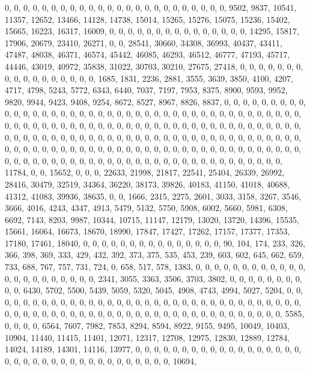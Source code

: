 \documentclass[
]{article}
\begin{document}
0, 0, 0, 0, 0, 0, 0, 0, 0, 0, 0, 0, 0, 0, 0, 0, 0, 0, 0, 0, 0, 0, 0, 0,
9502, 9837, 10541, 11357, 12652, 13466, 14128, 14738, 15014, 15265,
15276, 15075, 15236, 15402, 15665, 16223, 16317, 16009, 0, 0, 0, 0, 0,
0, 0, 0, 0, 0, 0, 0, 0, 0, 0, 14295, 15817, 17906, 20679, 23410, 26271,
0, 0, 28541, 30660, 34308, 36993, 40437, 43411, 47487, 48038, 46371,
46574, 45442, 46085, 46293, 46512, 46777, 47193, 45717, 44446, 43019,
40972, 35838, 31022, 30703, 30210, 27675, 27418, 0, 0, 0, 0, 0, 0, 0, 0,
0, 0, 0, 0, 0, 0, 0, 0, 0, 1685, 1831, 2236, 2881, 3555, 3639, 3850,
4100, 4207, 4717, 4798, 5243, 5772, 6343, 6440, 7037, 7197, 7953, 8375,
8900, 9593, 9952, 9820, 9944, 9423, 9408, 9254, 8672, 8527, 8967, 8826,
8837, 0, 0, 0, 0, 0, 0, 0, 0, 0, 0, 0, 0, 0, 0, 0, 0, 0, 0, 0, 0, 0, 0,
0, 0, 0, 0, 0, 0, 0, 0, 0, 0, 0, 0, 0, 0, 0, 0, 0, 0, 0, 0, 0, 0, 0, 0,
0, 0, 0, 0, 0, 0, 0, 0, 0, 0, 0, 0, 0, 0, 0, 0, 0, 0, 0, 0, 0, 0, 0, 0,
0, 0, 0, 0, 0, 0, 0, 0, 0, 0, 0, 0, 0, 0, 0, 0, 0, 0, 0, 0, 0, 0, 0, 0,
0, 0, 0, 0, 0, 0, 0, 0, 0, 0, 0, 0, 0, 0, 0, 0, 0, 0, 0, 0, 0, 0, 0, 0,
0, 0, 0, 0, 0, 0, 0, 0, 0, 0, 0, 0, 0, 0, 0, 0, 0, 0, 0, 0, 0, 0, 0, 0,
0, 0, 0, 0, 0, 0, 0, 0, 0, 0, 0, 0, 0, 0, 0, 0, 0, 0, 0, 0, 0, 0, 0, 0,
0, 11784, 0, 0, 15652, 0, 0, 0, 22633, 21998, 21817, 22541, 25404,
26339, 26992, 28416, 30479, 32519, 34364, 36220, 38173, 39826, 40183,
41150, 41018, 40688, 41312, 41083, 39936, 38635, 0, 0, 1666, 2315, 2275,
2601, 3033, 3158, 3267, 3546, 3666, 4016, 4243, 4347, 4913, 5479, 5132,
5750, 5908, 6002, 5660, 5981, 6308, 6692, 7143, 8203, 9987, 10344,
10715, 11147, 12179, 13020, 13720, 14396, 15535, 15661, 16064, 16673,
18670, 18990, 17847, 17427, 17262, 17157, 17377, 17353, 17180, 17461,
18040, 0, 0, 0, 0, 0, 0, 0, 0, 0, 0, 0, 0, 0, 0, 0, 90, 104, 174, 233,
326, 366, 398, 369, 333, 429, 432, 392, 373, 375, 535, 453, 239, 603,
602, 645, 662, 659, 733, 688, 767, 757, 731, 724, 0, 658, 517, 578,
1383, 0, 0, 0, 0, 0, 0, 0, 0, 0, 0, 0, 0, 0, 0, 0, 0, 0, 0, 0, 0, 0, 0,
2341, 3055, 3363, 3506, 3703, 3802, 0, 0, 0, 0, 0, 0, 0, 0, 0, 0, 6430,
5702, 5500, 5439, 5059, 5320, 5045, 4908, 4743, 4994, 5027, 5204, 0, 0,
0, 0, 0, 0, 0, 0, 0, 0, 0, 0, 0, 0, 0, 0, 0, 0, 0, 0, 0, 0, 0, 0, 0, 0,
0, 0, 0, 0, 0, 0, 0, 0, 0, 0, 0, 0, 0, 0, 0, 0, 0, 0, 0, 0, 0, 0, 0, 0,
0, 0, 0, 0, 0, 0, 0, 0, 0, 0, 0, 0, 0, 0, 5585, 0, 0, 0, 0, 6564, 7607,
7982, 7853, 8294, 8594, 8922, 9155, 9495, 10049, 10403, 10904, 11440,
11415, 11401, 12071, 12317, 12708, 12975, 12830, 12889, 12784, 14024,
14189, 14301, 14116, 13977, 0, 0, 0, 0, 0, 0, 0, 0, 0, 0, 0, 0, 0, 0, 0,
0, 0, 0, 0, 0, 0, 0, 0, 0, 0, 0, 0, 0, 0, 0, 0, 0, 0, 0, 0, 0, 10694,
\end{document}
